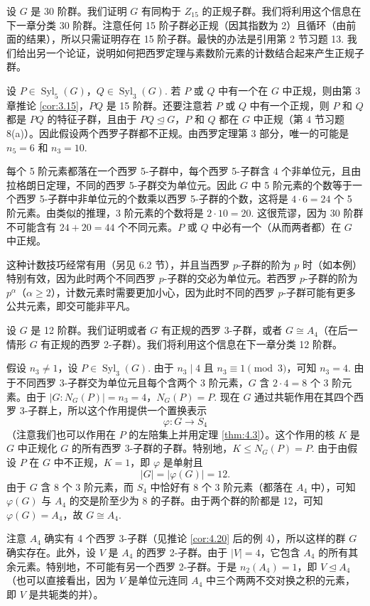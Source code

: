 \begin{example}[30 阶群]
设 \(G\) 是 30 阶群。我们证明 \(G\) 有同构于 \(Z_{15}\) 的正规子群。我们将利用这个信息在下一章分类 30 阶群。注意任何 15 阶子群必正规（因其指数为 2）且循环（由前面的结果），所以只需证明存在 15 阶子群。最快的办法是引用第 2 节习题 13. 我们给出另一个论证，说明如何把西罗定理与素数阶元素的计数结合起来产生正规子群。

设 \(P \in \operatorname{Syl}_5(G)\)，\(Q \in \operatorname{Syl}_3(G)\). 若 \(P\) 或 \(Q\) 中有一个在 \(G\) 中正规，则由第 3 章推论 \ref{cor:3.15}，\(PQ\) 是 15 阶群。还要注意若 \(P\) 或 \(Q\) 中有一个正规，则 \(P\) 和 \(Q\) 都是 \(PQ\) 的特征子群，且由于 \(PQ \trianglelefteq G\)，\(P\) 和 \(Q\) 都在 \(G\) 中正规（第 4 节习题 8(a)）。因此假设两个西罗子群都不正规。由西罗定理第 3 部分，唯一的可能是 \(n_5 = 6\) 和 \(n_3 = 10\).

每个 5 阶元素都落在一个西罗 5-子群中，每个西罗 5-子群含 4 个非单位元，且由拉格朗日定理，不同的西罗 5-子群交为单位元。因此 \(G\) 中 5 阶元素的个数等于一个西罗 5-子群中非单位元的个数乘以西罗 5-子群的个数，这将是 \(4 \cdot 6 = 24\) 个 5 阶元素。由类似的推理，3 阶元素的个数将是 \(2 \cdot 10 = 20\). 这很荒谬，因为 30 阶群不可能含有 \(24 + 20 = 44\) 个不同元素。\(P\) 或 \(Q\) 中必有一个（从而两者都）在 \(G\) 中正规。
\end{example}

这种计数技巧经常有用（另见 6.2 节），并且当西罗 \(p\)-子群的阶为 \(p\) 时（如本例）特别有效，因为此时两个不同西罗 \(p\)-子群的交必为单位元。若西罗 \(p\)-子群的阶为 \(p^\alpha\)（\(\alpha \geq 2\)），计数元素时需要更加小心，因为此时不同的西罗 \(p\)-子群可能有更多公共元素，即交可能非平凡。

\begin{example}[12 阶群]
设 \(G\) 是 12 阶群。我们证明或者 \(G\) 有正规的西罗 3-子群，或者 \(G \cong A_4\)（在后一情形 \(G\) 有正规的西罗 2-子群）。我们将利用这个信息在下一章分类 12 阶群。

假设 \(n_3 \neq 1\)，设 \(P \in \operatorname{Syl}_3(G)\). 由于 \(n_3 \mid 4\) 且 \(n_3 \equiv 1 \pmod{3}\)，可知 \(n_3 = 4\). 由于不同西罗 3-子群交为单位元且每个含两个 3 阶元素，\(G\) 含 \(2 \cdot 4 = 8\) 个 3 阶元素。由于 \(|G : N_G(P)| = n_3 = 4\)，\(N_G(P) = P\). 现在 \(G\) 通过共轭作用在其四个西罗 3-子群上，所以这个作用提供一个置换表示
\[
\varphi : G \to S_4
\]
（注意我们也可以作用在 \(P\) 的左陪集上并用定理 \ref{thm:4.3}）。这个作用的核 \(K\) 是 \(G\) 中正规化 \(G\) 的所有西罗 3-子群的子群。特别地，\(K \leq N_G(P) = P\). 由于由假设 \(P\) 在 \(G\) 中不正规，\(K = 1\)，即 \(\varphi\) 是单射且
\[
|G| = |\varphi(G)| = 12.
\]
由于 \(G\) 含 8 个 3 阶元素，而 \(S_4\) 中恰好有 8 个 3 阶元素（都落在 \(A_4\) 中），可知 \(\varphi(G)\) 与 \(A_4\) 的交是阶至少为 8 的子群。由于两个群的阶都是 12，可知 \(\varphi(G) = A_4\)，故 \(G \cong A_4\).

注意 \(A_4\) 确实有 4 个西罗 3-子群（见推论 \ref{cor:4.20} 后的例 4），所以这样的群 \(G\) 确实存在。此外，设 \(V\) 是 \(A_4\) 的西罗 2-子群。由于 \(|V| = 4\)，它包含 \(A_4\) 的所有其余元素。特别地，不可能有另一个西罗 2-子群。于是 \(n_2(A_4) = 1\)，即 \(V \trianglelefteq A_4\)（也可以直接看出，因为 \(V\) 是单位元连同 \(A_4\) 中三个两两不交对换之积的元素，即 \(V\) 是共轭类的并）。
\end{example}


